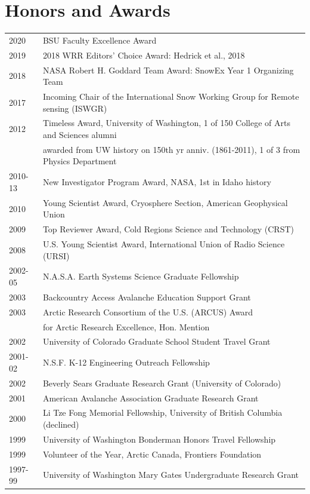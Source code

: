 \documentclass[11pt]{article}
\begin{document}
\section*{Honors and Awards}
\begin{tabular}{ll}
2020 & BSU Faculty Excellence Award \\
2019 & 2018 WRR Editors' Choice Award: Hedrick et al., 2018 \\
2018 & NASA Robert H. Goddard Team Award: SnowEx Year 1 Organizing Team \\
2017 & Incoming Chair of the International Snow Working Group for Remote sensing (ISWGR) \\
2012 & Timeless Award, University of Washington, 1 of 150 College of Arts and Sciences alumni  \\
& awarded from UW history on 150th yr anniv. (1861-2011), 1 of 3 from Physics Department \\
2010-13 & New Investigator Program Award, NASA, 1st in Idaho history \\
2010 & Young Scientist Award, Cryosphere Section, American Geophysical Union \\
2009 & Top Reviewer Award, Cold Regions Science and Technology (CRST) \\
2008 & U.S. Young Scientist Award, International Union of Radio Science (URSI) \\
2002-05 & N.A.S.A. Earth Systems Science Graduate Fellowship \\
2003 & Backcountry Access Avalanche Education Support Grant \\
2003 & Arctic Research Consortium of the U.S. (ARCUS) Award \\
& for Arctic Research Excellence, Hon. Mention \\
2002 & University of Colorado Graduate School Student Travel Grant \\
2001-02 & N.S.F. K-12 Engineering Outreach Fellowship \\
2002 & Beverly Sears Graduate Research Grant (University of Colorado) \\
2001 & American Avalanche Association Graduate Research Grant \\
2000 & Li Tze Fong Memorial Fellowship, University of British Columbia (declined) \\
1999 & University of Washington Bonderman Honors Travel Fellowship \\
1999 & Volunteer of the Year, Arctic Canada, Frontiers Foundation \\
1997-99 & University of Washington Mary Gates Undergraduate Research Grant \\

\end{tabular}
\end{document}
